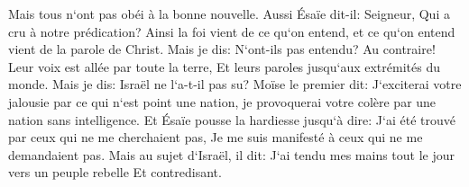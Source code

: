 \verse Mais tous n`ont pas obéi à la bonne nouvelle. Aussi Ésaïe dit-il: Seigneur, Qui a cru à notre prédication? 
\verse Ainsi la foi vient de ce qu`on entend, et ce qu`on entend vient de la parole de Christ. 
\verse Mais je dis: N`ont-ils pas entendu? Au contraire! Leur voix est allée par toute la terre, Et leurs paroles jusqu`aux extrémités du monde. 
\verse Mais je dis: Israël ne l`a-t-il pas su? Moïse le premier dit: J`exciterai votre jalousie par ce qui n`est point une nation, je provoquerai votre colère par une nation sans intelligence. 
\verse Et Ésaïe pousse la hardiesse jusqu`à dire: J`ai été trouvé par ceux qui ne me cherchaient pas, Je me suis manifesté à ceux qui ne me demandaient pas. 
\verse Mais au sujet d`Israël, il dit: J`ai tendu mes mains tout le jour vers un peuple rebelle Et contredisant. 


